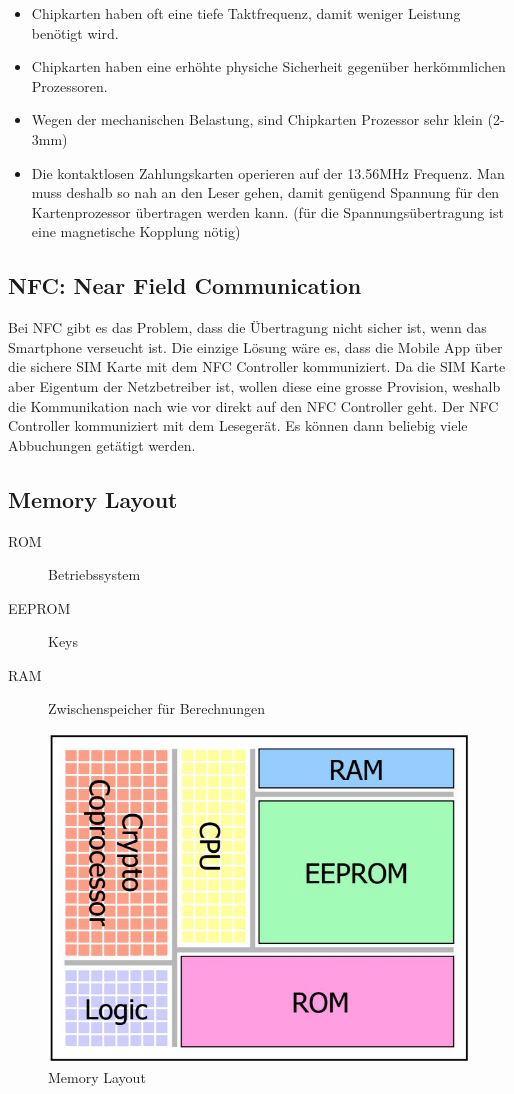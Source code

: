 \begin{itemize}
	\item Chipkarten haben oft eine tiefe Taktfrequenz, damit weniger Leistung benötigt wird.
	\item Chipkarten haben eine erhöhte physiche Sicherheit gegenüber herkömmlichen Prozessoren.
	\item Wegen der mechanischen Belastung, sind Chipkarten Prozessor sehr klein (2-3mm)
	\item Die kontaktlosen Zahlungskarten operieren auf der 13.56MHz Frequenz. Man muss deshalb so nah an den Leser gehen, damit genügend Spannung für den Kartenprozessor übertragen werden kann. (für die Spannungsübertragung ist eine magnetische Kopplung nötig)
\end{itemize}

\subsection{NFC: Near Field Communication}
Bei NFC gibt es das Problem, dass die Übertragung nicht sicher ist, wenn das Smartphone verseucht ist. Die einzige Lösung wäre es, dass die Mobile App über die sichere SIM Karte mit dem NFC Controller kommuniziert. Da die SIM Karte aber Eigentum der Netzbetreiber ist, wollen diese eine grosse Provision, weshalb die Kommunikation nach wie vor direkt auf den NFC Controller geht. Der NFC Controller kommuniziert mit dem Lesegerät. Es können dann beliebig viele Abbuchungen getätigt werden.

\subsection{Memory Layout}
\begin{description}
	\item[ROM] Betriebssystem
	\item[EEPROM] Keys
	\item[RAM] Zwischenspeicher für Berechnungen
\end{description}
\begin{figure}[h]
\centering
\includegraphics[width=0.3\linewidth]{images/card_memory_layout}
\caption{Memory Layout}
\label{fig:cardmemorylayout}
\end{figure}

